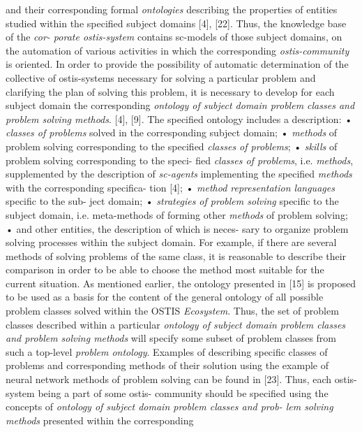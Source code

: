 \documentclass{article}
\begin{document}
and their corresponding formal \textit{ontologies} describing the
properties of entities studied within the specified subject
domains [4], [22]. Thus, the knowledge base of the \textit{cor-
porate ostis-system} contains sc-models of those subject
domains, on the automation of various activities in which
the corresponding \textit{ostis-community} is oriented. In order
to provide the possibility of automatic determination of
the collective of ostis-systems necessary for solving a
particular problem and clarifying the plan of solving
this problem, it is necessary to develop for each subject
domain the corresponding \textit{ontology of subject domain
problem classes and problem solving methods}. [4], [9].
The specified ontology includes a description:
• \textit{classes of problems} solved in the corresponding
  subject domain;
• \textit{methods} of problem solving corresponding to the
  specified \textit{classes of problems};
• \textit{skills} of problem solving corresponding to the speci-
  fied \textit{classes of problems}, i.e. \textit{methods}, supplemented
  by the description of \textit{sc-agents} implementing the
  specified \textit{methods} with the corresponding specifica-
  tion [4];
• \textit{method representation languages} specific to the sub-
  ject domain;
• \textit{strategies of problem solving} specific to the subject
  domain, i.e. meta-methods of forming other \textit{methods}
  of problem solving;
• and other entities, the description of which is        neces-
sary to organize problem solving processes within
the subject domain. For example, if there are several
methods of solving problems of the same class, it
is reasonable to describe their comparison in order
to be able to choose the method most suitable for
the current situation.
As mentioned earlier, the ontology presented in [15]
is proposed to be used as a basis for the content of the
general ontology of all possible problem classes solved
within the OSTIS \textit{Ecosystem}. Thus, the set of problem
classes described within a particular \textit{ontology of subject
domain problem classes and problem solving methods}
will specify some subset of problem classes from such
a top-level \textit{problem ontology}. Examples of describing
specific classes of problems and corresponding methods
of their solution using the example of neural network
methods of problem solving can be found in [23].
Thus, each ostis-system being a part of some ostis-
community should be specified using the concepts of
\textit{ontology of subject domain problem classes and prob-
lem solving methods} presented within the corresponding
\end{document}
